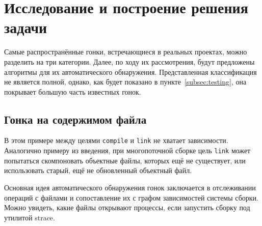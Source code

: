 \section{Исследование и построение решения задачи}
\label{sec:Chapter3} 


Самые распространённые гонки, встречающиеся в реальных проектах, можно разделить на три категории. Далее, по ходу их рассмотрения, будут предложены алгоритмы для их автоматического обнаружения. Представленная классификация не является полной, однако, как будет показано в пункте~\ref{subsec:testing}, она покрывает большую часть известных гонок.

\subsection{Гонка на содержимом файла}
\label{subsec:file-content-races}

\begin{figure}[H]

\end{figure}

В этом примере между целями \texttt{compile} и \texttt{link} не хватает зависимости. Аналогично примеру из введения, при многопоточной сборке цель \texttt{link} может попытаться скомпоновать объектные файлы, которых ещё не существует, или использовать старый, ещё не обновленный объектный файл.

Основная идея автоматического обнаружения гонок заключается в отслеживании операций с файлами и сопоставление их с графом зависимостей системы сборки. Можно увидеть, какие файлы открывают процессы, если запустить сборку под утилитой strace.

\begin{figure}[H]

\end{figure}

